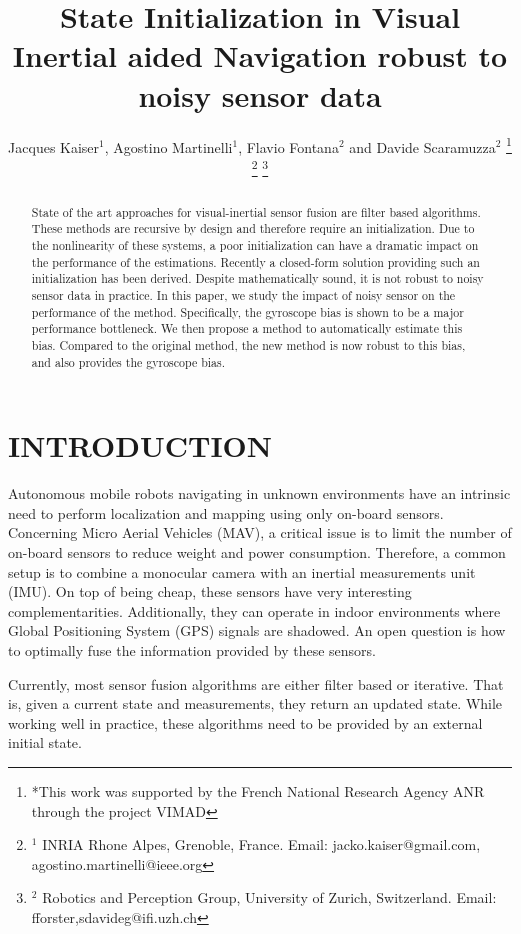 \documentclass[letterpaper, 10 pt, conference]{ieeeconf}  %
\title{\LARGE \bf
State Initialization in Visual Inertial aided Navigation robust to noisy sensor data
}
\author{Jacques Kaiser$^{1}$, Agostino Martinelli$^{1}$, Flavio Fontana$^{2}$ and Davide Scaramuzza$^{2}$%
 \thanks{*This work was supported by the French National Research
Agency ANR through the project VIMAD}%
 \thanks{$^{1}$ INRIA Rhone Alpes, Grenoble, France. Email: jacko.kaiser@gmail.com, agostino.martinelli@ieee.org}%
 \thanks{$^{2}$ Robotics and Perception Group, University of Zurich, Switzerland. Email: fforster,sdavideg@ifi.uzh.ch}%
}
\begin{document}
\maketitle
\thispagestyle{empty}
\pagestyle{empty}


\begin{abstract}
  State of the art approaches for visual-inertial sensor fusion are filter based algorithms.
  These methods are recursive by design and therefore require an initialization.
  Due to the nonlinearity of these systems, a poor initialization can have a dramatic impact on the performance of the estimations.
  Recently a closed-form solution providing such an initialization has been derived.
  Despite mathematically sound, it is not robust to noisy sensor data in practice.
  In this paper, we study the impact of noisy sensor on the performance of the method.
  Specifically, the gyroscope bias is shown to be a major performance bottleneck.
  We then propose a method to automatically estimate this bias.
  Compared to the original method, the new method is now robust to this bias, and also provides the gyroscope bias.
\end{abstract}



\section{INTRODUCTION}




Autonomous mobile robots navigating in unknown environments have an intrinsic need to perform localization and mapping using only on-board sensors.
Concerning Micro Aerial Vehicles (MAV), a critical issue is to limit the number of on-board sensors to reduce weight and power consumption.
Therefore, a common setup is to combine a monocular camera with an inertial measurements unit (IMU).
On top of being cheap, these sensors have very interesting complementarities.
Additionally, they can operate in indoor environments where Global Positioning System (GPS) signals are shadowed.
An open question is how to optimally fuse the information provided by these sensors.

Currently, most sensor fusion algorithms are either filter based or iterative. That is, given a current state and measurements, they return an updated state.
While working well in practice, these algorithms need to be provided by an external initial state.
\end{document}
